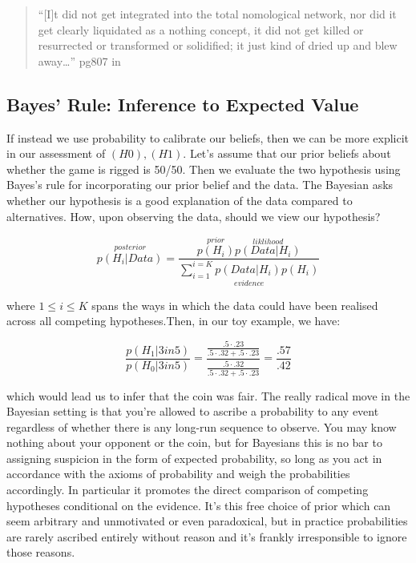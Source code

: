 \documentclass[]{tufte-book}
\theoremstyle{definition}
\theoremstyle{definition}
\theoremstyle{definition}
\theoremstyle{remark}
\begin{document}
\begin{quote}
``{[}I{]}t did not get integrated into the total nomological network, nor did it get clearly liquidated as a nothing concept, it did not get killed or resurrected or transformed or solidified; it just kind of dried up and blew away\ldots{}'' pg807 in \citep{MeehlTheoretical}
\end{quote}

\hypertarget{bayes-rule-inference-to-expected-value}{%
\subsection{Bayes' Rule: Inference to Expected Value}\label{bayes-rule-inference-to-expected-value}}

If instead we use probability to calibrate our beliefs, then we can be more explicit in our assessment of \((H0), (H1)\). Let's assume that our prior beliefs about whether the game is rigged is 50/50. Then we evaluate the two hypothesis using Bayes's rule for incorporating our prior belief and the data. The Bayesian asks whether our hypothesis is a good explanation of the data compared to alternatives. How, upon observing the data, should we view our hypothesis?

\[ \overset{posterior}{p(H_{i} | Data)} = \frac{\overset{prior}{p(H_{i})}\overset{liklihood}{p(Data | H_{i})}}{\underset{evidence}{\sum_{i=1}^{i =K} p(Data | H_{i})p(H_i)}}\]

where \(1 \leq i \leq K\) spans the ways in which the data could have been realised across all competing hypotheses.Then, in our toy example, we have:

\[ \frac{p(H_1 | 3 in 5)}{p(H_{0} | 3 in 5)} = \frac{\frac{.5\cdot .23}{.5\cdot .32 + .5 \cdot .23}}{\frac{.5\cdot .32}{.5\cdot .32 + .5 \cdot .23}} = \frac{.57}{.42} \]

which would lead us to infer that the coin was fair. The really radical move in the Bayesian setting is that you're allowed to ascribe a probability to any event regardless of whether there is any long-run sequence to observe. You may know nothing about your opponent or the coin, but for Bayesians this is no bar to assigning suspicion in the form of expected probability, so long as you act in accordance with the axioms of probability and weigh the probabilities accordingly. In particular it promotes the direct comparison of competing hypotheses conditional on the evidence. It's this free choice of prior which can seem arbitrary and unmotivated or even paradoxical, but in practice probabilities are rarely ascribed entirely without reason and it's frankly irresponsible to ignore those reasons.
\end{document}
